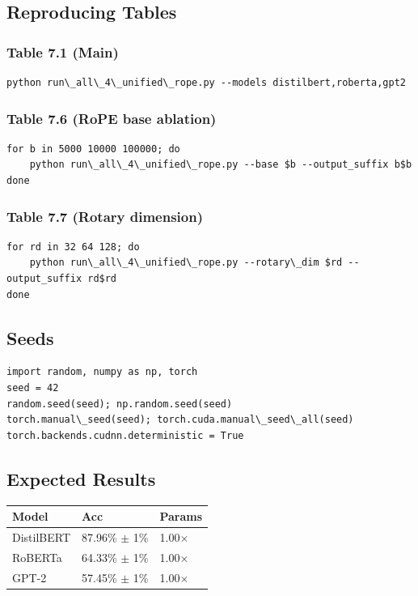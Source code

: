 \subsection{Reproducing Tables}

\subsubsection{Table 7.1 (Main)}

\begin{lstlisting}
python run\_all\_4\_unified\_rope.py --models distilbert,roberta,gpt2
\end{lstlisting}

\subsubsection{Table 7.6 (RoPE base ablation)}

\begin{lstlisting}
for b in 5000 10000 100000; do
    python run\_all\_4\_unified\_rope.py --base $b --output_suffix b$b
done
\end{lstlisting}

\subsubsection{Table 7.7 (Rotary dimension)}

\begin{lstlisting}
for rd in 32 64 128; do
    python run\_all\_4\_unified\_rope.py --rotary\_dim $rd --output_suffix rd$rd
done
\end{lstlisting}

\subsection{Seeds}

\begin{lstlisting}
import random, numpy as np, torch
seed = 42
random.seed(seed); np.random.seed(seed)
torch.manual\_seed(seed); torch.cuda.manual\_seed\_all(seed)
torch.backends.cudnn.deterministic = True
\end{lstlisting}

\subsection{Expected Results}

\begin{table}[H]
\centering
\small
\begin{tabular}{lll}
\toprule
\textbf{Model} & \textbf{Acc} & \textbf{Params} \\
\midrule
DistilBERT & 87.96\% $\pm$ 1\% & 1.00$\times$ \\
RoBERTa & 64.33\% $\pm$ 1\% & 1.00$\times$ \\
GPT-2 & 57.45\% $\pm$ 1\% & 1.00$\times$ \\
\bottomrule
\end{tabular}
\end{table}

